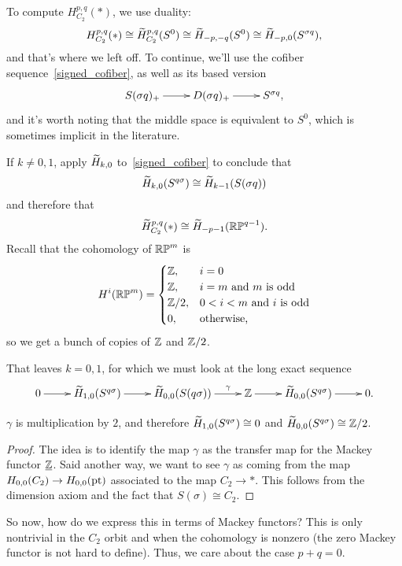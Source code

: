 
To compute $H_{C_2}^{p,q}(*)$, we use duality:
\[H_{C_2}^{p,q}(*) \cong \widetilde H^{p,q}_{C_2}(S^0)\cong \widetilde H_{-p,-q}(S^0)\cong \widetilde H_{-p,0}(S^{\sigma q}),\]
and that's where we left off. To continue, we'll use the cofiber sequence~\eqref{signed_cofiber}, as well as its
based version
\begin{equation}
\label{based_signed}
\xymatrix{
	S(\sigma q)_+\ar[r] & D(\sigma q)_+\ar[r] & S^{\sigma q},
}
\end{equation}
and it's worth noting that the middle space is equivalent to $S^0$, which is sometimes implicit in the literature.

If $k\ne 0,1$, apply $\widetilde H_{k,0}$ to~\eqref{signed_cofiber} to conclude that
\[\widetilde H_{k,0}(S^{q\sigma})\cong \widetilde H_{k-1}(S(\sigma q))\]
and therefore that
\[\widetilde H_{C_2}^{p,q}(*)\cong \widetilde H_{-p-1}(\mathbb{RP}^{q-1}).\]
Recall that the cohomology of $\mathbb{RP}^m$ is
\[H^i(\mathbb{RP}^m) = \begin{cases}
	\mathbb Z, &i = 0\\
	\mathbb Z, &i = m\text{ and $m$ is odd}\\
	\mathbb Z/2, &0 < i < m\text{ and $i$ is odd}\\
	0, &\text{otherwise,}
\end{cases}\]
so we get a bunch of copies of $\mathbb Z$ and $\mathbb Z/2$.

That leaves $k = 0,1$, for which we must look at the long exact sequence
\[\xymatrix{
	0\ar[r] & \wH_{1,0}(S^{q\sigma})\ar[r] & \wH_{0,0}(S(q\sigma))\ar[r]^-\gamma &\Z\ar[r] &
	\wH_{0,0}(S^{q\sigma})\ar[r] & 0.
}\]
\begin{claim}
$\gamma$ is multiplication by $2$, and therefore $\widetilde H_{1,0}(S^{q\sigma})\cong 0$ and
$\widetilde H_{0,0}(S^{q\sigma})\cong\mathbb Z/2$.
\end{claim}
\begin{proof}
The idea is to identify the map $\gamma$ as the transfer map for the Mackey functor
$\underline{\mathbb Z}$. Said another way, we want to see $\gamma$ as coming from the map $H_{0,0}(C_2)\to H_{0,0}(\mathrm{pt})$
associated to the map $C_2\to *$. This follows from the dimension axiom and the fact that $S(\sigma)\cong C_2$.
\end{proof}
So now, how do we express this in terms of Mackey functors? This is only nontrivial in the $C_2$ orbit and when the
cohomology is nonzero (the zero Mackey functor is not hard to define). Thus, we care about the case $p+q = 0$.


